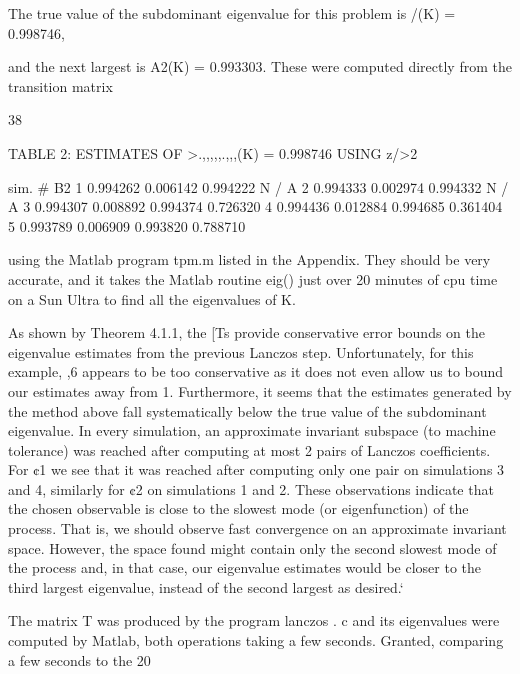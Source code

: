 {The true value of the subdominant eigenvalue for this problem is /\max(K) = 0.998746,

and the next largest is A2(K) = 0.993303. These were computed directly from the transition matrix

38

TABLE 2: ESTIMATES OF >.,,,,,.,,,(K) = 0.998746 USING z/>2

  
   
  
  
   
  

  
  
   
   

   
  
  
   
  

    
   
   
   

sim. # B2
1 0.994262 0.006142 0.994222 N / A
2 0.994333 0.002974 0.994332 N / A
3 0.994307 0.008892 0.994374 0.726320
4 0.994436 0.012884 0.994685 0.361404
5 0.993789 0.006909 0.993820 0.788710

using the Matlab program tpm.m listed in the Appendix. They should be very accurate, and it
takes the Matlab routine eig() just over 20 minutes of cpu time on a Sun Ultra to ﬁnd all the
eigenvalues of K.

As shown by Theorem 4.1.1, the [Ts provide conservative error bounds on the eigenvalue
estimates from the previous Lanczos step. Unfortunately, for this example, ,6 appears to be too
conservative as it does not even allow us to bound our estimates away from 1. Furthermore, it
seems that the estimates generated by the method above fall systematically below the true value of
the subdominant eigenvalue. In every simulation, an approximate invariant subspace (to machine
tolerance) was reached after computing at most 2 pairs of Lanczos coefficients. For ¢1 we see that
it was reached after computing only one pair on simulations 3 and 4, similarly for ¢2 on simulations
1 and 2. These observations indicate that the chosen observable is close to the slowest mode (or
eigenfunction) of the process. That is, we should observe fast convergence on an approximate
invariant space. However, the space found might contain only the second slowest mode of the
process and, in that case, our eigenvalue estimates would be closer to the third largest eigenvalue,
instead of the second largest as desired.‘

The matrix T was produced by the program lanczos . c and its eigenvalues were computed
by Matlab, both operations taking a few seconds. Granted, comparing a few seconds to the 20

}
